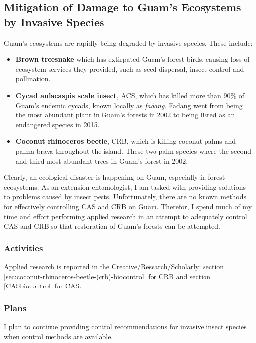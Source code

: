 \subsection{Mitigation of Damage to Guam's Ecosystems by Invasive Species}

Guam's ecosystems are rapidly being degraded by invasive species. These include:
\begin{itemize}
	\item \textbf{Brown treesnake} which has extirpated Guam's forest birds, causing loss of ecosystem services they provided, such as seed dispersal, insect control and pollination.
	\item \textbf{Cycad aulacaspis scale insect}, ACS, which has killed more than 90\% of Guam's endemic cycads, known locally as \textit{fadang}. Fadang went from being the most abundant plant in Guam's forests in 2002 to being listed as an endangered species in 2015.
	\item \textbf{Coconut rhinoceros beetle}, CRB, which is killing coconut palms and palma brava throughout the island. These two palm species where the second and third most abundant trees in Guam's forest in 2002. 
\end{itemize}

Clearly, an ecological disaster is happening on Guam, especially in forest ecosystems. As an extension entomologist, I am tasked with providing solutions to problems caused by insect pests. Unfortunately, there are no known methods for effectively controlling CAS and CRB on Guam. Therefor, I spend much of my time and effort performing applied research in an attempt to adequately control CAS and CRB so that restoration of Guam's forests can be attempted. 

\subsubsection{Activities}

Applied research is reported  in the Creative/Research/Scholarly: section \ref{sec:coconut-rhinoceros-beetle-(crb)-biocontrol} for CRB and section \ref{CASbiocontrol} for CAS.

\subsubsection{Plans}

I plan to continue providing control recommendations for invasive insect species when control methods are available.

